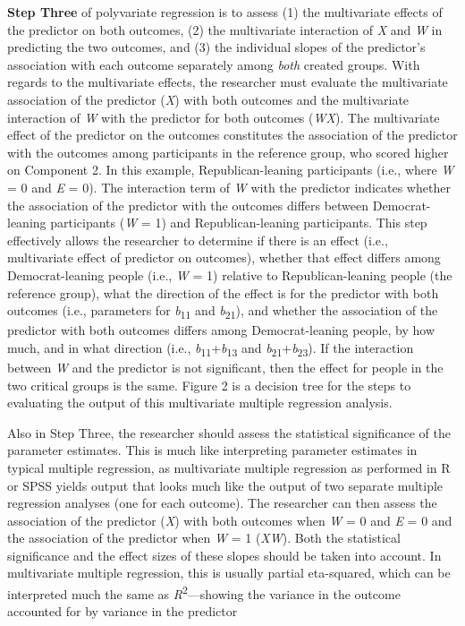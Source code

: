 \documentclass[authordate, meta, issue]{jote-new-article}
\begin{document}
	\textbf{Step Three} of polyvariate regression is to assess (1) the multivariate effects of the predictor on both outcomes, (2) the multivariate interaction of \emph{X} and \emph{W} in predicting the two outcomes, and (3) the individual slopes of the predictor's association with each outcome separately among \emph{both} created groups. With regards to the multivariate effects, the researcher must evaluate the multivariate association of the predictor (\emph{X}) with both outcomes and the multivariate interaction of \emph{W} with the predictor for both outcomes (\emph{WX}). The multivariate effect of the predictor on the outcomes constitutes the association of the predictor with the outcomes among participants in the reference group, who scored higher on Component 2. In this example, Republican-leaning participants (i.e., where \emph{W} = 0 and \emph{E} = 0). The interaction term of \emph{W} with the predictor indicates whether the association of the predictor with the outcomes differs between Democrat-leaning participants (\emph{W} = 1) and Republican-leaning participants. This step effectively allows the researcher to determine if there is an effect (i.e., multivariate effect of predictor on outcomes), whether that effect differs among Democrat-leaning people (i.e., \emph{W} = 1) relative to Republican-leaning people (the reference group), what the direction of the effect is for the predictor with both outcomes (i.e., parameters for \emph{b}\textsubscript{11} and \emph{b}\textsubscript{21}), and whether the association of the predictor with both outcomes differs among Democrat-leaning people, by how much, and in what direction (i.e., \emph{b}\textsubscript{11}+\emph{b}\textsubscript{13} and \emph{b}\textsubscript{21}+\emph{b}\textsubscript{23}). If the interaction between \emph{W} and the predictor is not significant, then the effect for people in the two critical groups is the same. Figure 2 is a decision tree for the steps to evaluating the output of this multivariate multiple regression analysis.



	Also in Step Three, the researcher should assess the statistical significance of the parameter estimates. This is much like interpreting parameter estimates in typical multiple regression, as multivariate multiple regression as performed in R or SPSS yields output that looks much like the output of two separate multiple regression analyses (one for each outcome). The researcher can then assess the association of the predictor (\emph{X}) with both outcomes when \emph{W} = 0 and \emph{E} = 0 and the association of the predictor when \emph{W} = 1 (\emph{XW}). Both the statistical significance and the effect sizes of these slopes should be taken into account. In multivariate multiple regression, this is usually partial eta-squared, which can be interpreted much the same as \emph{R}\textsuperscript{2}—showing the variance in the outcome accounted for by variance in the predictor
\end{document}
